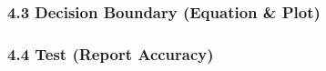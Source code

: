 \documentclass[11pt]{article}
\begin{document}
    \subsubsection{4.3 Decision Boundary (Equation \&
Plot)}\label{decision-boundary-equation-plot}

    \subsubsection{4.4 Test (Report Accuracy)}\label{test-report-accuracy}


    
    
    
    
\end{document}
